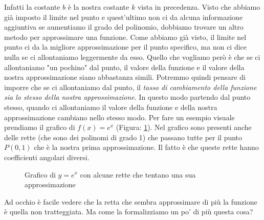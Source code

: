 Infatti la costante $b$ è la nostra costante $k$ vista in precedenza. Visto che abbiamo già imposto il limite nel punto e quest'ultimo non ci da alcuna informazione aggiuntiva se aumentiamo il grado del polinomio, dobbiamo trovare un altro metodo per approssimare una funzione. Come abbiamo già visto, il limite nel punto ci da la migliore approssimazione per il punto specifico, ma non ci dice nulla se ci allontaniamo leggermente da esso. Quello che vogliamo però è che se ci allontaniamo "un pochino" dal punto, il valore della funzione e il valore della nostra approssimazione siano abbastanza simili. Potremmo quindi pensare di imporre che se ci allontaniamo dal punto, il \textit{tasso di cambiamento della funzione sia lo stesso della nostra approssimazione}. In questo modo partendo dal punto stesso, quando ci allontaniamo il valore della funzione e della nostra approssimazione cambiano nello stesso modo. Per fare un esempio visuale prendiamo il grafico di $f(x) = e^x$ (Figura: \ref{fig:EsponenzialeGrafico}). Nel grafico sono presenti anche delle rette (che sono dei polinomi di grado 1) che passano tutte per il punto $P(0, 1)$ che è la nostra prima approssimazione. Il fatto è che queste rette hanno coefficienti angolari diversi.

\begin{figure}[h]
\centering
{}
\caption{Grafico di $y = e^x$ con alcune rette che tentano una sua approssimazione}
	\label{fig:EsponenzialeGrafico}
\end{figure}


Ad occhio è facile vedere che la retta che sembra approssimare di più la funzione è quella non tratteggiata. Ma come la formalizziamo un po' di più questa cosa?

